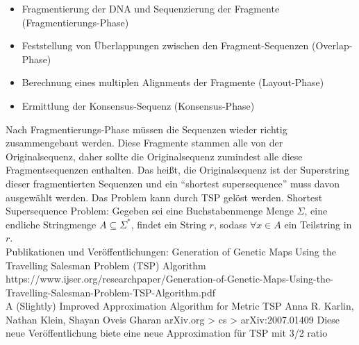 \documentclass{article}
\begin{document}
\begin{flushleft}
\begin{itemize}
    \item Fragmentierung der DNA und Sequenzierung der Fragmente (Fragmentierungs-Phase)
    \item Feststellung von Überlappungen zwischen den Fragment-Sequenzen (Overlap-Phase)
    \item Berechnung eines multiplen Alignments der Fragmente (Layout-Phase)
    \item Ermittlung der Konsensus-Sequenz (Konsensus-Phase)
\end{itemize}
Nach Fragmentierungs-Phase müssen die Sequenzen wieder richtig zusammengebaut werden.
Diese Fragmente stammen alle von der Originalsequenz, daher sollte die Originalsequenz zumindest 
alle diese Fragmentsequenzen enthalten. Das heißt, die Originalsequenz ist der Superstring dieser fragmentierten Sequenzen
und ein ``shortest supersequence'' muss davon ausgewählt werden. Das Problem kann durch TSP gelöst werden.
\newline
Shortest Supersequence Problem:
\newline
Gegeben sei eine Buchstabenmenge Menge $\Sigma$, eine endliche Stringmenge $A\subseteq \Sigma^*$,
findet ein String $r$, sodass $\forall x\in A$ ein Teilstring in $r$.
\newline\\
Publikationen und Veröffentlichungen:
\newline
Generation of Genetic Maps Using the Travelling Salesman Problem (TSP) Algorithm
\href{International Journal of Scientific & Engineering Research, Volume 5, Issue 6, June-2014}
\newline
https://www.ijser.org/researchpaper/Generation-of-Genetic-Maps-Using-the-Travelling-Salesman-Problem-TSP-Algorithm.pdf
\newline \\
A (Slightly) Improved Approximation Algorithm for Metric TSP
\newline
Anna R. Karlin, Nathan Klein, Shayan Oveis Gharan
\newline
arXiv.org > cs > arXiv:2007.01409
\newline
Diese neue Veröffentlichung biete eine neue Approximation für TSP mit 3/2 ratio
\end{flushleft}
\end{document}
